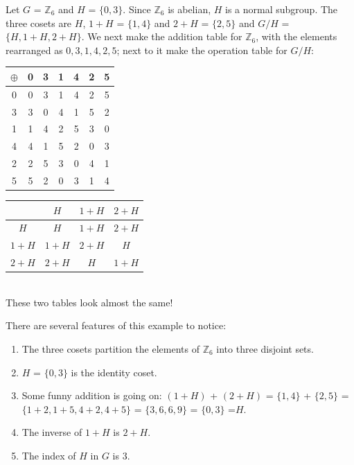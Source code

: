 \documentclass[12pt]{book}
\theoremstyle{definition}
\def\Z{\mathbb{Z}}
\begin{document}
\begin{tcexample}{}{}
 Let $G$ = $\Z_6$ and $H$ = $\{0,3\}$. Since $\Z_6$ is abelian, $H$ is a normal subgroup. The three cosets are $H$, $1+H$ = $\{1,4\}$ and $2+H$ = $\{2,5\}$ and $G/H$ = $\{H, 1+H, 2+H\}$.
We next make the addition table for $\Z_6$, with the elements rearranged as $0, 3, 1, 4, 2, 5$; next to it  make the operation table for $G/H$:



\begin{center}
	\begin{tabular}{c||cc|cc|cc}
		$\oplus$ & 0 & 3 & 1 & 4 & 2 & 5 \\ \hline\hline
		0 & 0 & 3 & 1 & 4 & 2 & 5 \\
		3 & 3 & 0 & 4 & 1 & 5 & 2 \\ \hline
		1 & 1 & 4 & 2 & 5 & 3 & 0 \\
		4 & 4 & 1 & 5 & 2 & 0 & 3 \\ \hline
		2 & 2 & 5 & 3 & 0 & 4 & 1 \\
		5 & 5 & 2 & 0 & 3 & 1 & 4
	\end{tabular}
	\qquad\qquad
	\begin{tabular}{c | c c c}
		& $H$ & $1+H$ & $2+H$ \\ \hline
		$H$ & $H$ & $1+H$ & $2+H$ \\
		$1+H$ & $1+H$ & $2+H$ & $H$ \\
		$2+H$ & $2+H$ & $H$ & $1+H$
	\end{tabular}
\end{center}
~\\[.1in]

These two tables look almost the same!

There are several features of this example to notice:
\begin{enumerate}
	
	\item
	The three cosets partition the elements of $\Z_6$ into three disjoint sets.
	\item
	$H$ = $\{0,3\}$ is the identity coset.
	
	\item
	Some funny addition is going on: $(1+H)$ + $(2+H)$ = $\{1,4\}$ + $\{2,5\}$ = $\{1+2,1+5,4+2,4+5\}$ = $\{3,6,6,9\}$ = $\{0,3\}$ =$H$.
	
	\item
	The inverse of $1+H$ is $2+H$.
	\item
	The index of $H$ in $G$ is $3$.
\end{enumerate}
\end{tcexample}
\end{document}
